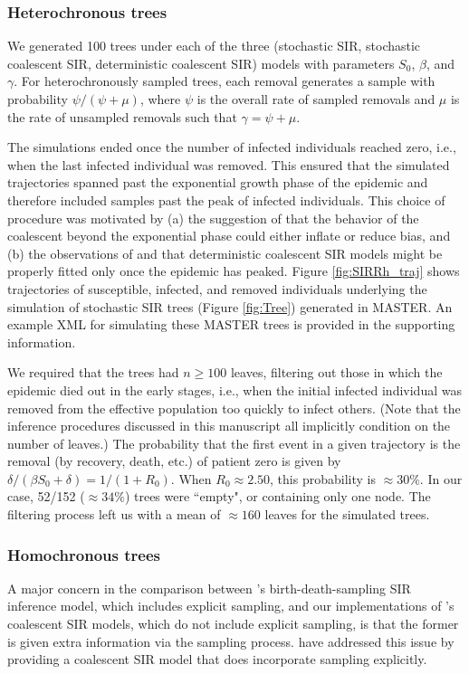 \documentclass[12pt,titlepage]{article}
\newcommand{\stochCoalSIR}{stochastic coalescent SIR}
\newcommand{\deterCoalSIR}{deterministic coalescent SIR}
\newcommand{\stochSIR}{stochastic SIR}
\begin{document}
\subsubsection{Heterochronous trees}  We generated 100 trees under each of the three (\stochSIR{}, \stochCoalSIR{}, \deterCoalSIR{}) models
with parameters $S_{0}$, $\beta$, and $\gamma$.  For heterochronously sampled trees, each removal generates a sample with probability $\psi/(\psi+\mu)$, where $\psi$ is the overall rate of sampled removals and $\mu$ is the rate of unsampled removals such that $\gamma = \psi + \mu$.  

The simulations ended once the number of infected individuals reached zero, i.e., when the last infected individual was removed. This ensured that the simulated trajectories spanned past the exponential growth phase of the epidemic and therefore included samples past the peak of infected individuals.  This choice of procedure was motivated by (a) the suggestion of \cite{Stadler:2014} that the behavior of the 
coalescent beyond the exponential phase could either inflate or reduce bias, and (b) the observations of \cite{DearloveandWilson} and \cite{Veronika} that deterministic coalescent SIR models might be properly fitted only once the epidemic has peaked.  
Figure \ref{fig:SIRRh_traj} shows trajectories of susceptible, infected, and removed individuals underlying the simulation of stochastic SIR trees (Figure \ref{fig:Tree}) generated in MASTER.  An example XML for simulating these MASTER trees is provided in the supporting information.

We required that the trees had $n\geq 100$ leaves, filtering out those in which the epidemic died out in the early stages, i.e., when the initial infected individual was removed from the effective population too quickly to infect others.
(Note that the inference procedures
discussed in this manuscript all implicitly condition on the number of leaves.)
The probability that the first event in a given trajectory is the removal (by recovery, death, etc.) of patient zero is given by $\delta/(\beta S_{0} + \delta) = {1}/({1+{R_{0}}})$.
When $R_{0}\approx 2.50$, this probability is $\approx 30\%$.
In our case, 52/152 ($\approx 34\%$) trees were ``empty", or containing only one node.
The filtering process left us with a mean of $\approx 160$ leaves for the simulated trees.

\subsubsection{Homochronous trees}  A major concern in the comparison between \cite{Kuhnert:2014}'s birth-death-sampling SIR inference model, which includes explicit sampling, and our implementations of \cite{Volz:2012}'s coalescent SIR models, which do not include explicit sampling, 
is that the former is given extra information via the sampling process.  
\cite{VolzFrost:2014} have addressed this issue by providing a coalescent SIR model that does incorporate sampling explicitly.
\end{document}
